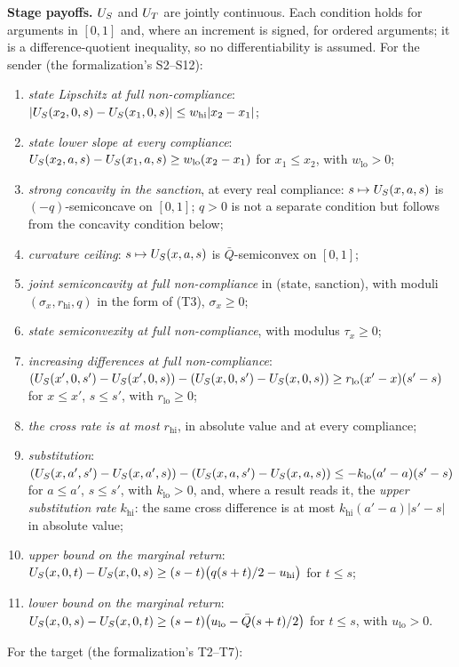 \textbf{Stage payoffs.} $U_S$ and $U_T$ are jointly continuous. Each condition
holds for arguments in $[0,1]$ and, where an increment is signed, for ordered
arguments; it is a difference-quotient inequality, so no differentiability is assumed. For
the sender (the formalization's S2--S12):
\begin{enumerate}[label=(S\arabic*)]
\item \emph{state Lipschitz at full non-compliance}:
$|U_S(x_2,0,s)-U_S(x_1,0,s)|\le w_{\mathrm{hi}}|x_2-x_1|$;
\item \emph{state lower slope at every compliance}:
$U_S(x_2,a,s)-U_S(x_1,a,s)\ge w_{\mathrm{lo}}(x_2-x_1)$ for $x_1\le x_2$, with
$w_{\mathrm{lo}}>0$;
\item \emph{strong concavity in the sanction}, at every real compliance:
$s\mapsto U_S(x,a,s)$ is $(-q)$-semiconcave on $[0,1]$; $q>0$ is not a separate
condition but follows from the concavity condition below;
\item \emph{curvature ceiling}: $s\mapsto U_S(x,a,s)$ is $\bar Q$-semiconvex on
$[0,1]$;
\item \emph{joint semiconcavity at full non-compliance} in (state, sanction), with
moduli $(\sigma_x,r_{\mathrm{hi}},q)$ in the form of (T3), $\sigma_x\ge0$;
\item \emph{state semiconvexity at full non-compliance}, with modulus $\tau_x\ge0$;
\item \emph{increasing differences at full non-compliance}:
$(U_S(x',0,s')-U_S(x',0,s))-(U_S(x,0,s')-U_S(x,0,s))\ge r_{\mathrm{lo}}(x'-x)(s'-s)$
for $x\le x'$, $s\le s'$, with $r_{\mathrm{lo}}\ge0$;
\item \emph{the cross rate is at most $r_{\mathrm{hi}}$}, in absolute value and
at every compliance;
\item \emph{substitution}:
$(U_S(x,a',s')-U_S(x,a',s))-(U_S(x,a,s')-U_S(x,a,s))\le-k_{\mathrm{lo}}(a'-a)(s'-s)$
for $a\le a'$, $s\le s'$, with $k_{\mathrm{lo}}>0$, and, where a result reads
it, the \emph{upper substitution rate} $k_{\mathrm{hi}}$: the same cross difference is at most
$k_{\mathrm{hi}}(a'-a)|s'-s|$ in absolute value;
\item \emph{upper bound on the marginal return}: $U_S(x,0,t)-U_S(x,0,s)\ge(s-t)\bigl(q(s+t)/2-u_{\mathrm{hi}}\bigr)$
for $t\le s$;
\item \emph{lower bound on the marginal return}: $U_S(x,0,s)-U_S(x,0,t)\ge(s-t)\bigl(u_{\mathrm{lo}}-\bar Q(s+t)/2\bigr)$
for $t\le s$, with $u_{\mathrm{lo}}>0$.
\end{enumerate}
For the target (the formalization's T2--T7):
